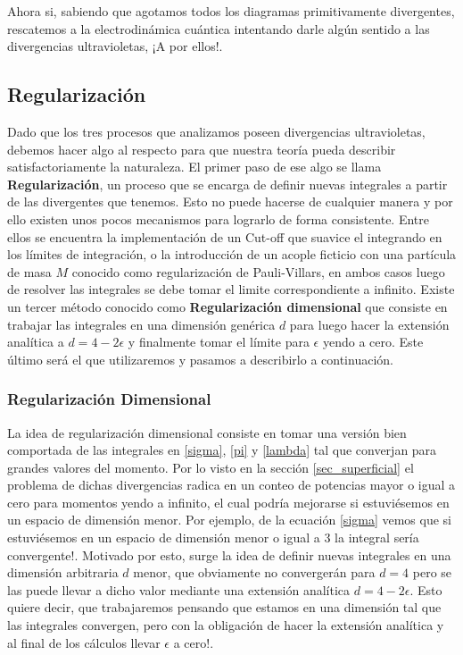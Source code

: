 \documentclass[tickz]{article}
\numberwithin{equation}{section}
\begin{document}
Ahora si, sabiendo que agotamos todos los diagramas primitivamente divergentes, rescatemos a la electrodinámica cuántica intentando darle algún sentido a las divergencias ultravioletas, ¡A por ellos!.

\subsection{Regularización}

Dado que los tres procesos que analizamos poseen divergencias ultravioletas, debemos hacer algo al respecto para que nuestra teoría pueda describir satisfactoriamente la naturaleza. El primer paso de ese algo se llama \textbf{Regularización}, un proceso que se encarga de definir nuevas integrales a partir de las divergentes que tenemos. Esto no puede hacerse de cualquier manera y por ello existen unos pocos mecanismos para lograrlo de forma consistente. Entre ellos se encuentra la implementación de un Cut-off que suavice el integrando en los límites de integración, o la introducción de un acople ficticio con una partícula de masa $ M $ conocido como regularización de Pauli-Villars, en ambos casos luego de resolver las integrales se debe tomar el limite correspondiente a infinito. Existe un tercer método conocido como \textbf{Regularización dimensional} que consiste en trabajar las integrales en una dimensión genérica $ d $ para luego hacer la extensión analítica a $ d=4-2\epsilon $ y finalmente tomar el límite para $ \epsilon $ yendo a cero. Este último será el que utilizaremos y pasamos a describirlo a continuación.\\

\subsubsection{Regularización Dimensional}\label{sec_RD}

La idea de regularización dimensional consiste en tomar una versión bien comportada de las integrales en \ref{sigma}, \ref{pi} y \ref{lambda} tal que converjan para grandes valores del momento. Por lo visto en la sección \ref{sec_superficial} el problema de dichas divergencias radica en un conteo de potencias mayor o igual a cero para momentos yendo a infinito, el cual podría mejorarse si estuviésemos en un espacio de dimensión menor. Por ejemplo, de la ecuación \ref{sigma} vemos que si estuviésemos en un espacio de dimensión menor o igual a 3 la integral sería convergente!. Motivado por esto, surge la idea de definir nuevas integrales en una dimensión arbitraria $ d $ menor, que obviamente no convergerán para $ d=4 $ pero se las puede llevar a dicho valor mediante una extensión analítica $ d=4-2\epsilon $. Esto quiere decir, que trabajaremos pensando que estamos en una dimensión tal que las integrales convergen, pero con la obligación de hacer la extensión analítica y al final de los cálculos llevar $ \epsilon $ a cero!.\\
\end{document}
